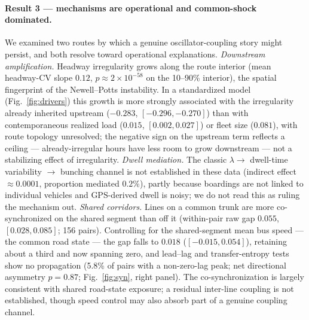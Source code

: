 \documentclass[9pt,twocolumn,twoside]{opticajnl}
\begin{document}
\paragraph{Result 3 --- mechanisms are operational and common-shock dominated.}
We examined two routes by which a genuine oscillator-coupling story might persist, and both
resolve toward operational explanations. \emph{Downstream amplification.} Headway irregularity
grows along the route interior (mean headway-CV slope $0.12$, $p\approx 2\times10^{-58}$ on
the 10--90\% interior), the spatial fingerprint of the Newell--Potts instability. In a
standardized model (Fig.~\ref{fig:drivers}) this growth is more strongly associated with the
irregularity already inherited upstream ($-0.283$, $[-0.296,-0.270]$) than with contemporaneous
realized load ($0.015$, $[0.002,0.027]$) or fleet size ($0.081$), with route topology
unresolved; the negative sign on the upstream term reflects a ceiling --- already-irregular
hours have less room to grow downstream --- not a stabilizing effect of irregularity.
\emph{Dwell mediation.} The classic $\lambda \to$ dwell-time variability $\to$ bunching channel
is not established in these data (indirect effect $\approx 0.0001$, proportion mediated
$0.2\%$), partly because boardings are not linked to individual vehicles and GPS-derived dwell
is noisy; we do not read this as ruling the mechanism out. \emph{Shared corridors.} Lines on a
common trunk are more co-synchronized on the shared segment than off it (within-pair raw gap
$0.055$, $[0.028,0.085]$; 156 pairs). Controlling for the shared-segment mean bus speed --- the
common road state --- the gap falls to $0.018$ ($[-0.015,0.054]$), retaining about a third and
now spanning zero, and lead--lag and transfer-entropy tests show no propagation (5.8\% of pairs
with a non-zero-lag peak; net directional asymmetry $p=0.87$; Fig.~\ref{fig:syn}, right panel). The
co-synchronization is largely consistent with shared road-state exposure; a residual inter-line
coupling is not established, though speed control may also absorb part of a genuine coupling
channel.
\end{document}
